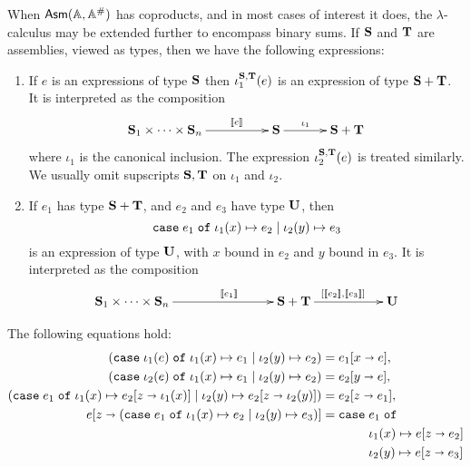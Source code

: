 When $\mathsf{Asm}(\mathbb{A},\mathbb{A}^{\#})$ has coproducts, and in most cases of interest it does,
the $\lambda$-calculus may be extended further to encompass binary
sums. If $\mathbf{S}$ and $\mathbf{T}$ are assemblies, viewed as types, then
we have the following expressions:
%
\begin{enumerate}
\item If $e$ is an expressions of type $\mathbf{S}$ then
  $\iota_1^{\mathbf{S},\mathbf{T}}(e)$ is an expression of type $\mathbf{S} +
  \mathbf{T}$. It is interpreted as the composition
  \begin{equation*}
    \xymatrix{
      **[l]{\asm{S}_1 \times \cdots \times \asm{S}_n}
      \ar[r]^{\sem{e}}
      &
      {\asm{S}}
      \ar[r]^{\iota_1}
      &
     **[r]{\asm{S} + \asm{T}}
    }
  \end{equation*}
  where $\iota_1$ is the canonical inclusion. The expression
  $\iota_2^{\mathbf{S},\mathbf{T}}(e)$ is treated similarly. We usually omit
  supscripts $\mathbf{S}, \mathbf{T}$ on $\iota_1$ and $\iota_2$.
\item If $e_1$ has type $\mathbf{S} + \mathbf{T}$, and $e_2$ and $e_3$ have
  type $\mathbf{U}$, then
  \begin{equation*}
    \mathtt{case}\;e_1\;\mathtt{of}\;\iota_1(x) \mapsto e_2 \mid \iota_2(y) \mapsto e_3
  \end{equation*}
  is an expression of type $\mathbf{U}$, with $x$ bound in $e_2$ and
  $y$ bound in $e_3$. It is interpreted as the composition
  \begin{equation*}
    \xymatrix@+3em{
      **[l]{\asm{S}_1 \times \cdots \times \asm{S}_n}
      \ar[r]^{\sem{e_1}}
      &
      {\asm{S} + \asm{T}}
      \ar[r]^{[\sem{e_2}, \sem{e_3}]}
      &
      {\asm{U}}
    }
  \end{equation*}
\end{enumerate}
%
The following equations hold:
%
\begin{align*}
  (\mathtt{case}\;\iota_1(e)\;\mathtt{of}\;\iota_1(x) \mapsto e_1 \mid \iota_2(y) \mapsto e_2) &=
  e_1[x \shortrightarrow e], \\
  (\mathtt{case}\;\iota_2(e)\;\mathtt{of}\;\iota_1(x) \mapsto e_1 \mid \iota_2(y) \mapsto e_2) &=
  e_2[y \shortrightarrow e], \\
  (\mathtt{case}\;e_1\;\mathtt{of}\;\iota_1(x) \mapsto e_2[z \shortrightarrow \iota_1(x)] \mid \iota_2(y) \mapsto e_2[z \shortrightarrow \iota_2(y)]
  ) &= e_2[z \shortrightarrow e_1], \\
  e[z \shortrightarrow (\mathtt{case}\;e_1\;\mathtt{of}\;\iota_1(x) \mapsto e_2 \mid \iota_2(y) \mapsto e_3)] &=
  \begin{aligned}[t]\mathtt{case}\;&e_1\;\mathtt{of}\\&\iota_1(x) \mapsto e[z \shortrightarrow e_2] \\&\iota_2(y) \mapsto e[z \shortrightarrow e_3]\end{aligned}
\end{align*}


